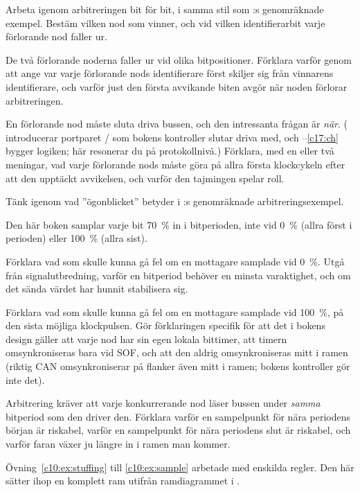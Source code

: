  Arbeta igenom arbitreringen bit för bit, i samma stil som :s
genomräknade exempel. Bestäm vilken nod som vinner, och vid vilken identifierarbit varje förlorande
nod faller ur.

 De två förlorande noderna faller ur vid olika bitpositioner. Förklara varför genom att ange
var varje förlorande nods identifierare först skiljer sig från vinnarens identifierare, och varför
just den första avvikande biten avgör när noden förlorar arbitreringen.

 En förlorande nod måste sluta driva bussen, och den intressanta frågan är \emph{när}.
( introducerar portparet / som bokens kontroller slutar
driva med, och --\ref{c17:ch} bygger logiken; här resonerar du på protokollnivå.)
Förklara, med en eller två meningar, vad varje förlorande nods  måste göra på
allra första klockcykeln efter att den upptäckt avvikelsen, och varför den tajmingen spelar roll.

\note[Ledtråd]Tänk igenom vad ”ögonblicket” betyder i :s genomräknade
arbitreringsexempel.

\label{c10:ex:sample}
Den här boken samplar varje bit 70~\% in i bitperioden, inte vid 0~\% (allra först i perioden) eller
100~\% (allra sist).

 Förklara vad som skulle kunna gå fel om en mottagare samplade vid 0~\%. Utgå från
signalutbredning, varför en bitperiod behöver en minsta varaktighet, och om det sända värdet har
hunnit stabilisera sig.

 Förklara vad som skulle kunna gå fel om en mottagare samplade vid 100~\%, på den sista
möjliga klockpulsen. Gör förklaringen specifik för att det i bokens design gäller att varje nod har
sin egen lokala bittimer, att timern omsynkroniseras bara vid SOF, och att den aldrig
omsynkroniseras mitt i ramen (riktig CAN omsynkroniserar på flanker även mitt i ramen; bokens
kontroller gör inte det).

 Arbitrering kräver att varje konkurrerande nod läser bussen under \emph{samma} bitperiod
som den driver den. Förklara varför en sampelpunkt för nära periodens början är riskabel, varför en
sampelpunkt för nära periodens slut är riskabel, och varför faran växer ju längre in i ramen man
kommer.

\label{c10:ex:frame}
Övning~\ref{c10:ex:stuffing} till \ref{c10:ex:sample} arbetade med enskilda regler. Den här sätter
ihop en komplett ram utifrån ramdiagrammet i .

